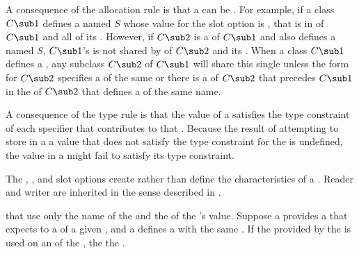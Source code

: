 \endlist

A consequence of the allocation rule is that a  can be
.  For example, if a class $C\sub 1$ defines 
a  named $S$
whose value for the  slot option is ,
that  is  
in  of $C\sub 1$ and all of its
.  However, if $C\sub 2$ is a  
of $C\sub 1$ and also
defines a  named $S$\negthinspace, $C\sub 1$'s 
 is not shared
by  of $C\sub 2$ and its . When a class
$C\sub 1$ defines a , any subclass $C\sub 2$ of $C\sub
1$ will share this single  
unless the  form for
$C\sub 2$ specifies a  of the same 
 or there is a 
of $C\sub 2$ that precedes $C\sub 1$ in the  of
$C\sub 2$ that defines a  of the same name.

A consequence of the type rule is that the value of a 
satisfies the type constraint of each  specifier that
contributes to that .  Because the result of attempting to
store in a  a value that does not satisfy the type
constraint for the  is undefined, the value in a 
might fail to satisfy its type constraint.
     
The , , and  slot options
create  rather than define the characteristics of a .
Reader and writer  are inherited in the sense described in
\secref\MethodInheritance.

 that   use only the name of the
 and the  of the 's value.  Suppose
a  provides a  that expects to  a
 of a given , and a  defines
a  with the same .  If the  provided 
by the  is used on an  of the , 
the   the .
